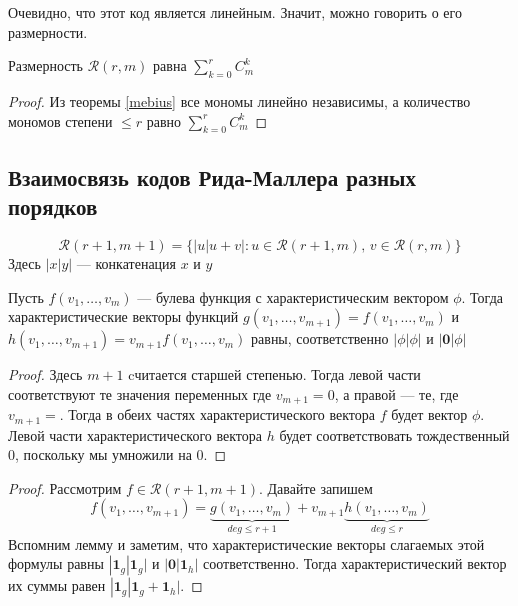 Очевидно, что этот код является линейным. Значит, можно говорить о его размерности.

\begin{note}
Размерность $\mathscr{R}(r,m)$ равна $\sum\limits_{k=0}^r C_m^k$
\end{note}

\begin{proof}
Из теоремы \ref{mebius} все мономы линейно независимы, а количество мономов степени $\le r$ равно
$\sum\limits_{k=0}^r C_m^k$
\end{proof}

\subsection{Взаимосвязь кодов Рида-Маллера разных порядков}

\begin{theorem}
$$\mathscr{R}(r+1,m+1) = \{|u|u+v| : u \in \mathscr{R}(r+1,m),\, v \in \mathscr{R}(r,m)\}$$
Здесь $|x|y|$ --- конкатенация $x$ и $y$
\end{theorem}

\begin{lemma}
Пусть $f(v_1, \ldots, v_m)$ --- булева функция с характеристическим вектором $\phi$. Тогда
характеристические векторы функций $g(v_1, \ldots, v_{m+1}) = f(v_1, \ldots, v_m)$ и $h(v_1, \ldots, v_{m+1}) = v_{m+1} f(v_1, \ldots, v_m)$
равны, соответственно $|\phi|\phi|$ и $|\mathbf{0}|\phi|$
\end{lemma}

\begin{proof}
Здесь $m+1$ cчитается старшей степенью. Тогда левой части соответствуют те значения переменных
где $v_{m+1} = 0$, а правой --- те, где $v_{m+1}=$. Тогда в обеих частях характеристического 
вектора $f$ будет вектор $\phi$. Левой части характеристического вектора $h$ будет соответствовать
тождественный $0$, поскольку мы умножили на 0.
\end{proof}

\begin{proof}

Рассмотрим $f \in \mathscr{R}(r+1,m+1)$. Давайте запишем 
   $$f(v_1, \ldots, v_{m+1}) = \underbrace{g(v_1, \ldots, v_m)}_{deg \le r+1} + 
   v_{m+1} \underbrace{h(v_1, \ldots, v_m)}_{deg \le r}$$
  Вспомним лемму и заметим, что характеристические векторы слагаемых этой формулы равны 
  $|\mathbf{1}_g|\mathbf{1}_g|$ и $|\mathbf{0}|\mathbf{1}_h|$ соответственно. Тогда
  характеристический вектор их суммы равен $|\mathbf{1}_g|\mathbf{1}_g+\mathbf{1}_h|$.
\end{proof}

